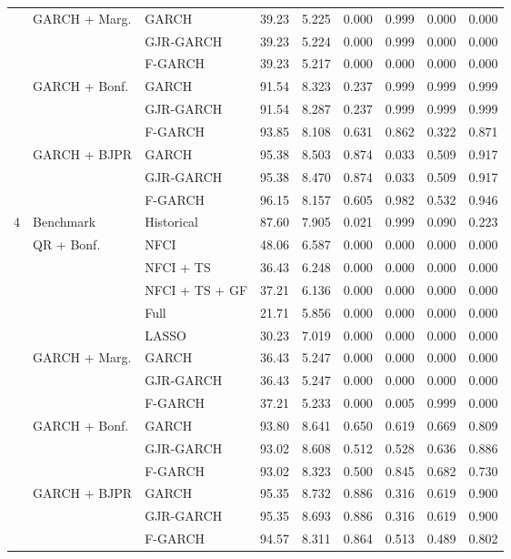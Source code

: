 \begin{tabular}{llp{10em}cccccc}
& \multirow{3}{*}{{GARCH + Marg.}} &    GARCH  & 39.23 & 5.225 & 0.000 & 0.999 & 0.000 & 0.000 \\ 
& &   GJR-GARCH  & 39.23 & 5.224 & 0.000 & 0.999 & 0.000 & 0.000 \\ 
& &   F-GARCH  & 39.23 & 5.217 & 0.000 & 0.000 & 0.000 & 0.000 \\  \cmidrule(lr){2-3} \cmidrule(lr){4-5} \cmidrule(lr){6-9}
& \multirow{3}{*}{{GARCH + Bonf.}} &    GARCH  & 91.54 & 8.323 & 0.237 & 0.999 & 0.999 & 0.999 \\ 
& &   GJR-GARCH  & 91.54 & 8.287 & 0.237 & 0.999 & 0.999 & 0.999 \\ 
& &   F-GARCH  & 93.85 & 8.108 & 0.631 & 0.862 & 0.322 & 0.871 \\  \cmidrule(lr){2-3} \cmidrule(lr){4-5} \cmidrule(lr){6-9}
& \multirow{3}{*}{{GARCH + BJPR}} &    GARCH  & 95.38 & 8.503 & 0.874 & 0.033 & 0.509 & 0.917 \\ 
& &   GJR-GARCH  & 95.38 & 8.470 & 0.874 & 0.033 & 0.509 & 0.917 \\ 
& &   F-GARCH  & 96.15 & 8.157 & 0.605 & 0.982 & 0.532 & 0.946 \\ 
\toprule
\multirow{15}{*}{{4}} &
                      \multirow{1}{*}{{Benchmark}} & Historical & 87.60 & 7.905 & 0.021 & 0.999 & 0.090 & 0.223 \\  \cmidrule(lr){2-3} \cmidrule(lr){4-5} \cmidrule(lr){6-9}
& \multirow{5}{*}{{QR + Bonf.}} &   NFCI & 48.06 & 6.587 & 0.000 & 0.000 & 0.000 & 0.000 \\ 
& &   NFCI + TS & 36.43 & 6.248 & 0.000 & 0.000 & 0.000 & 0.000 \\ 
& &   NFCI + TS + GF  & 37.21 & 6.136 & 0.000 & 0.000 & 0.000 & 0.000 \\ 
& &   Full & 21.71 & 5.856 & 0.000 & 0.000 & 0.000 & 0.000 \\ 
& &   LASSO & 30.23 & 7.019 & 0.000 & 0.000 & 0.000 & 0.000 \\  \cmidrule(lr){2-3} \cmidrule(lr){4-5} \cmidrule(lr){6-9}
& \multirow{3}{*}{{GARCH + Marg.}} &    GARCH  & 36.43 & 5.247 & 0.000 & 0.000 & 0.000 & 0.000 \\ 
& &   GJR-GARCH  & 36.43 & 5.247 & 0.000 & 0.000 & 0.000 & 0.000 \\ 
& &   F-GARCH  & 37.21 & 5.233 & 0.000 & 0.005 & 0.999 & 0.000 \\  \cmidrule(lr){2-3} \cmidrule(lr){4-5} \cmidrule(lr){6-9}
& \multirow{3}{*}{{GARCH + Bonf.}} &    GARCH  & 93.80 & 8.641 & 0.650 & 0.619 & 0.669 & 0.809 \\ 
& &   GJR-GARCH  & 93.02 & 8.608 & 0.512 & 0.528 & 0.636 & 0.886 \\ 
& &   F-GARCH  & 93.02 & 8.323 & 0.500 & 0.845 & 0.682 & 0.730 \\  \cmidrule(lr){2-3} \cmidrule(lr){4-5} \cmidrule(lr){6-9}
& \multirow{3}{*}{{GARCH + BJPR}} &    GARCH  & 95.35 & 8.732 & 0.886 & 0.316 & 0.619 & 0.900 \\ 
& &   GJR-GARCH  & 95.35 & 8.693 & 0.886 & 0.316 & 0.619 & 0.900 \\ 
& &   F-GARCH  & 94.57 & 8.311 & 0.864 & 0.513 & 0.489 & 0.802 \\ 
\toprule
\end{tabular}
